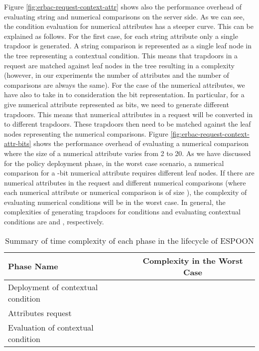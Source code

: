 \documentclass[epsfig,a4paper,11pt,titlepage]{book}
\numberwithin{algorithm}{chapter}
\begin{document}
Figure \ref{fig:erbac-request-context-attr} shows also the performance overhead of evaluating string and numerical comparisons on the server side. As we can see, the condition evaluation for numerical attributes has a steeper curve. This can be explained as follows. For the first case, for each string attribute only a single trapdoor is generated. A string comparison is represented as a single leaf node in the tree representing a contextual condition. This means that  trapdoors in a request are matched against  leaf nodes in the tree resulting in a  complexity (however, in our experiments the number of attributes and the number of comparisons are always the same). For the case of the numerical attributes, we have also to take in to consideration the bit representation. In particular, for a give numerical attribute represented as  bits, we need to generate  different trapdoors. This means that  numerical attributes in a request will be converted in to  different trapdoors. These trapdoors then need to be matched against the leaf nodes representing the numerical comparisons. Figure \ref{fig:erbac-request-context-attr-bits} shows the performance overhead of evaluating a numerical comparison where the size of a numerical attribute varies from 2 to 20. As we have discussed for the policy deployment phase, in the worst case scenario, a numerical comparison for a -bit numerical attribute requires  different leaf nodes. If there are  numerical attributes in the request and  different numerical comparisons (where each numerical attribute or numerical comparison is of size ), the complexity of evaluating numerical conditions will be  in the worst case. In general, the complexities of generating trapdoors for conditions and evaluating contextual conditions are  and , respectively.

\begin{table} [htp]
\centering
\caption[Time complexity of each phase in the lifecycle of ESPOON]{Summary of time complexity of each phase in the lifecycle of \gls{ESPOON}}
\label{tab:espoon-complexity-summary}
\begin{tabular}{ |l|c| } 

\hline

\textbf{Phase Name} & \textbf{Complexity in the Worst Case} \\ \hline

Deployment of contextual condition &  \\ \hline

Attributes request &  \\ \hline

Evaluation of contextual condition &  \\ \hline

\end{tabular}

\end{table}
\end{document}
